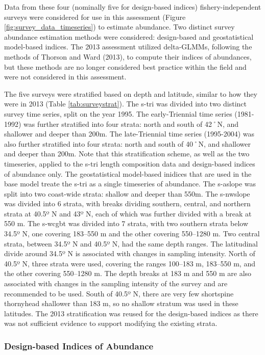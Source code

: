 \documentclass[11pt,
  letterpaper,
]{article}
\begin{document}
Data from these four (nominally five for design-based indices) fishery-independent surveys were considered for use in this assessment (Figure \ref{fig:survey_data_timeseries}) to estimate abundance. Two distinct survey abundance estimation methods were considered: design-based and geostatistical model-based indices. The 2013 assessment utilized delta-GLMMs, following the methods of Thorson and Ward (2013), to compute their indices of abundances, but these methods are no longer considered best practice within the field and were not considered in this assessment.

The five surveys were stratified based on depth and latitude, similar to how they were in 2013 (Table \ref{tab:surveystrat}). The \gls{s-tri} was divided into two distinct survey time series, split on the year 1995. The early-Triennial time series (1981-1992) was further stratified into four strata: north and south of 42˚N, and shallower and deeper than 200m. The late-Triennial time series (1995-2004) was also further stratified into four strata: north and south of 40˚N, and shallower and deeper than 200m. Note that this stratification scheme, as well as the two timeseries, applied to the \gls{s-tri} length composition data and design-based indices of abundance only. The geostatistical model-based inidices that are used in the base model treate the \gls{s-tri} as a single timeseries of abundance. The \gls{s-aslope} was split into two coast-wide strata: shallow and deeper than 550m. The \gls{s-nwslope} was divided into 6 strata, with breaks dividing southern, central, and northern strata at 40.5º N and 43º N, each of which was further divided with a break at 550 m. The \gls{s-wcgbt} was divided into 7 strata, with two southern strata below 34.5º N, one covering 183--550 m and the other covering 550--1280 m. Two central strata, between 34.5º N and 40.5º N, had the same depth ranges. The latitudinal divide around 34.5º N is associated with changes in sampling intensity. North of 40.5º N, three strata were used, covering the ranges 100--183 m, 183--550 m, and the other covering 550--1280 m. The depth breaks at 183 m and 550 m are also associated with changes in the sampling intensity of the survey and are recommended to be used. South of 40.5º N, there are very few shortspine thornyhead shallower than 183 m, so no shallow stratum was used in these latitudes. The 2013 stratification was reused for the design-based indices as there was not sufficient evidence to support modifying the existing strata.

\hypertarget{design-based-indices-of-abundance}{%
\subsubsection{Design-based Indices of Abundance}\label{design-based-indices-of-abundance}}
\end{document}
